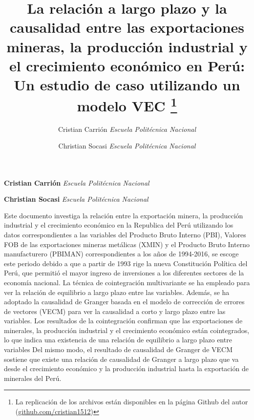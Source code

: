 \documentclass[11pt,]{article}
\title{La relación a largo plazo y la causalidad entre las exportaciones
mineras, la producción industrial y el crecimiento económico en Perú: Un estudio de caso utilizando un modelo VEC \thanks{La replicación de los archivos están disponibles en la página Github del
autor (\href{https://github.com/cristian1512}{github.com/cristian1512})}  }
\author{\Large Cristian Carrión\vspace{0.05in} \newline\normalsize\emph{Escuela Politécnica Nacional}   \and \Large Christian Socasi\vspace{0.05in} \newline\normalsize\emph{Escuela Politécnica Nacional}  }
\date{}
\newcommand*{\authorfont}{\fontfamily{phv}\selectfont}
\renewenvironment{abstract}
 {{%
    \setlength{\leftmargin}{0mm}
    \setlength{\rightmargin}{\leftmargin}%
  }%
  \relax}
 {\endlist}
\begin{document}
	
%

{%
\setlength{\parindent}{0pt}
\thispagestyle{plain}
{\fontsize{18}{20}\selectfont\raggedright 
\maketitle  %

}

{
   \vskip 13.5pt\relax \normalsize\fontsize{11}{12} 
\textbf{\authorfont Cristian Carrión} \hskip 15pt \emph{\small Escuela Politécnica Nacional}   \par \textbf{\authorfont Christian Socasi} \hskip 15pt \emph{\small Escuela Politécnica Nacional}   

}

}








\begin{abstract}

    \hbox{\vrule height .2pt width 39.14pc}

    \vskip 8.5pt %

\noindent Este documento investiga la relación entre la exportación minera, la
producción industrial y el crecimiento económico en la Republica del
Perú utilizando los datos correspondientes a las variables del Producto
Bruto Interno (PBI), Valores FOB de las exportaciones mineras metálicas
(XMIN) y el Producto Bruto Interno manufacturero (PBIMAN)
correspondientes a los años de 1994-2016, se escoge este periodo debido
a que a partir de 1993 rige la nueva Constitución Política del Perú, que
permitió el mayor ingreso de inversiones a los diferentes sectores de la
economía nacional. La técnica de cointegración multivariante se ha
empleado para ver la relación de equilibrio a largo plazo entre las
variables. Además, se ha adoptado la causalidad de Granger basada en el
modelo de corrección de errores de vectores (VECM) para ver la
causalidad a corto y largo plazo entre las variables. Los resultados de
la cointegración confirman que las exportaciones de minerales, la
producción industrial y el crecimiento económico están cointegrados, lo
que indica una existencia de una relación de equilibrio a largo plazo
entre variables Del mismo modo, el resultado de causalidad de Granger de
VECM sostiene que existe una relación de causalidad de Granger a largo
plazo que va desde el crecimiento económico y la producción industrial
hasta la exportación de minerales del Perú.


    \hbox{\vrule height .2pt width 39.14pc}


\end{abstract}
\end{document}
